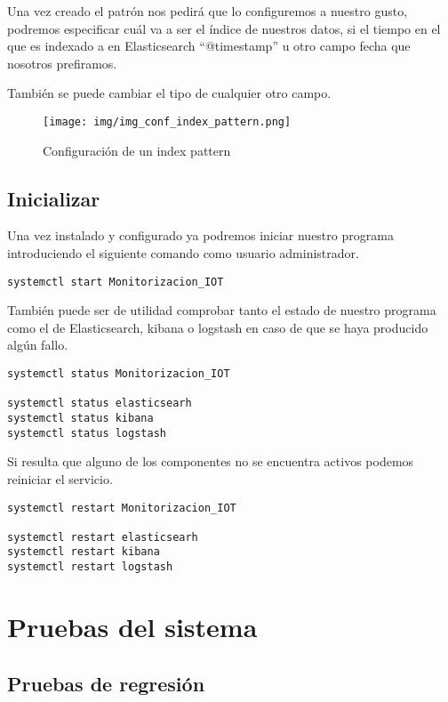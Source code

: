 Una vez creado el patrón nos pedirá que lo configuremos a nuestro gusto, podremos especificar cuál va a ser el índice de nuestros datos, si el tiempo en el que es indexado a en Elasticsearch ``@timestamp'' u otro campo fecha que nosotros prefiramos.

También se puede cambiar el tipo de cualquier otro campo.

\begin{figure}[h]
	\centering
	\texttt{[image: img/img\_conf\_index\_pattern.png]}
	\caption{Configuración de un index pattern}
	\label{img_conf_index_pattern.png}
\end{figure}
\newpage



\subsection{Inicializar \nombrePrograma}

Una vez instalado y configurado ya podremos iniciar nuestro programa introduciendo el siguiente comando como usuario administrador.
\begin{lstlisting}[frame=single]  
systemctl start Monitorizacion_IOT
\end{lstlisting}

También puede ser de utilidad comprobar tanto el estado de nuestro programa como el de Elasticsearch, kibana o logstash en caso de que se haya producido algún fallo.

\begin{lstlisting}[frame=single]  
systemctl status Monitorizacion_IOT

systemctl status elasticsearh
systemctl status kibana
systemctl status logstash
\end{lstlisting}

Si resulta que alguno de los componentes no se encuentra activos podemos reiniciar el servicio.

\begin{lstlisting}[frame=single]  
systemctl restart Monitorizacion_IOT

systemctl restart elasticsearh
systemctl restart kibana
systemctl restart logstash
\end{lstlisting}

\section{Pruebas del sistema}

\subsection{Pruebas de regresión}

